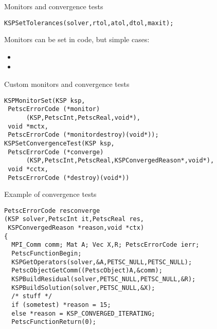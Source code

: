 \begin{numberedframe}{Monitors and convergence tests}
\begin{lstlisting}
KSPSetTolerances(solver,rtol,atol,dtol,maxit);
\end{lstlisting}
Monitors can be set in code, but simple cases:
\begin{itemize}
\item {}
\item {}
\end{itemize}
\end{numberedframe}

\begin{longversion}
\begin{numberedframe}{Custom monitors and convergence tests}
\begin{lstlisting}
KSPMonitorSet(KSP ksp,
 PetscErrorCode (*monitor)
      (KSP,PetscInt,PetscReal,void*),
 void *mctx,
 PetscErrorCode (*monitordestroy)(void*));
KSPSetConvergenceTest(KSP ksp,
 PetscErrorCode (*converge)
      (KSP,PetscInt,PetscReal,KSPConvergedReason*,void*),
 void *cctx,
 PetscErrorCode (*destroy)(void*))
\end{lstlisting}
\end{numberedframe}

\begin{numberedframe}{Example of convergence tests}
\begin{lstlisting}
PetscErrorCode resconverge
(KSP solver,PetscInt it,PetscReal res,
 KSPConvergedReason *reason,void *ctx)
{
  MPI_Comm comm; Mat A; Vec X,R; PetscErrorCode ierr;
  PetscFunctionBegin;
  KSPGetOperators(solver,&A,PETSC_NULL,PETSC_NULL);
  PetscObjectGetComm((PetscObject)A,&comm); 
  KSPBuildResidual(solver,PETSC_NULL,PETSC_NULL,&R);
  KSPBuildSolution(solver,PETSC_NULL,&X); 
  /* stuff */
  if (sometest) *reason = 15;
  else *reason = KSP_CONVERGED_ITERATING;
  PetscFunctionReturn(0);
\end{lstlisting}
\end{numberedframe}




\end{longversion}
